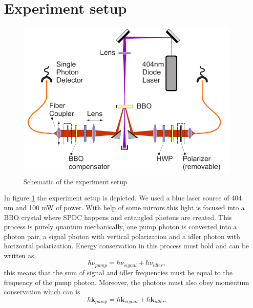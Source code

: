 \documentclass[a4paper,10pt]{article}
\renewcommand{\k}{\mathbf{k}}
\begin{document}
\section{Experiment setup}
\begin{figure}[H]
\centering
\includegraphics[width=.9\textwidth]{img/setup}
\caption{Schematic of the experiment setup}\label{setup}
\end{figure}
In figure \ref{setup} the experiment setup is depicted. We used a blue laser source of 404 nm and 100 mW of power. With help of some mirrors this light is focused into a BBO crystal where SPDC happens and entangled photons are created. This process is purely quantum mechanically, one pump photon is converted into a photon pair, a signal photon with vertical polarization and a idler photon with horizontal polarization. Energy conservation in this process must hold and can be written as
\begin{equation}\hbar \nu_{pump} = \hbar \nu_{signal} + \hbar\nu_{idler},\end{equation}
this means that the sum of signal and idler frequencies must be equal to the frequency of the pump photon. Moreover, the photons must also obey momentum conservation which can is
\begin{equation}\hbar \k_{pump} = \hbar \k_{signal} + \hbar\k_{idler}.\end{equation}
\end{document}
